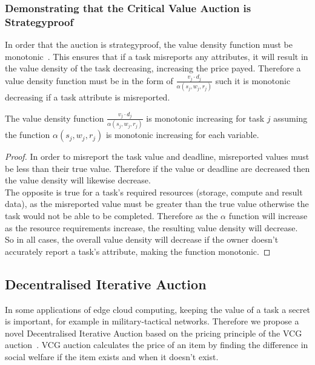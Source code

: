 \subsubsection{Demonstrating that the Critical Value Auction is Strategyproof}
\label{subsubsec:critical-value-auction-strategyproof}
In order that the auction is strategyproof, the value density function must be
monotonic~\cite{nisan2007algorithmic_229_230}. This ensures that if a task misreports any attributes, it will result
in the value density of the task decreasing, increasing the price payed. Therefore a value density function must be in
the form of $\frac{v_j \cdot d_j}{\alpha(s_j, w_j, r_j)}$ such it is monotonic decreasing if a task attribute is
misreported.
\begin{theorem}
    The value density function $\frac{v_j \cdot d_j}{\alpha(s_j, w_j, r_j)}$ is monotonic increasing for task $j$
    assuming the function $\alpha(s_j, w_j, r_j)$ is monotonic increasing for each variable.
\end{theorem}
\begin{proof}
    In order to misreport the task value and deadline, misreported values must be less than their true value. Therefore
    if the value or deadline are decreased then the value density will likewise decrease. \\
    The opposite is true for a task's required resources (storage, compute and result data), as the misreported value
    must be greater than the true value otherwise the task would not be able to be completed. Therefore as the $\alpha$
    function will increase as the resource requirements increase, the resulting value density will decrease. \\
    So in all cases, the overall value density will decrease if the owner doesn't accurately report a task's attribute,
    making the function monotonic.
\end{proof}

\subsection{Decentralised Iterative Auction}
\label{subsec:decentralised-iterative-auction}
In some applications of edge cloud computing, keeping the value of a task a secret is important, for example in
military-tactical networks. Therefore we propose a novel Decentralised Iterative Auction based on the pricing principle
of the VCG auction~\cite{vickrey,Clarke,groves}. VCG auction calculates the price of an item by finding the
difference in social welfare if the item exists and when it doesn't exist.

